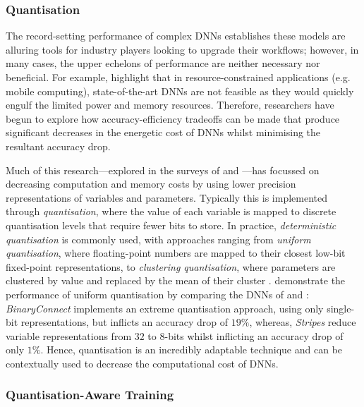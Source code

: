 \documentclass[a4paper, 11pt]{report}
\begin{document}
    \subsubsection{Quantisation}
    \label{section: quantisation}

    The record-setting performance of complex DNNs establishes these models are alluring tools for industry players looking to upgrade their workflows; however, in many cases, the upper echelons of performance are neither necessary nor beneficial. For example, \citet{kumar-2020} highlight that in resource-constrained applications (e.g. mobile computing), state-of-the-art DNNs are not feasible as they would quickly engulf the limited power and memory resources. Therefore, researchers have begun to explore how accuracy-efficiency tradeoffs can be made that produce significant decreases in the energetic cost of DNNs whilst minimising the resultant accuracy drop.
    
    Much of this research---explored in the surveys of \citet{xu-2021} and \citet{cai-2022}---has focussed on decreasing computation and memory costs by using lower precision representations of variables and parameters. Typically this is implemented through \emph{quantisation}, where the value of each variable is mapped to discrete quantisation levels that require fewer bits to store. In practice, \emph{deterministic quantisation} is commonly used, with approaches ranging from \emph{uniform quantisation}, where floating-point numbers are mapped to their closest low-bit fixed-point representations, to \emph{clustering quantisation}, where parameters are clustered by value and replaced by the mean of their cluster \citep{xu-2021}. \citet{kumar-2020} demonstrate the performance of uniform quantisation by comparing the DNNs of \citet{courbariaux-2015} and \citet{judd-2016}: \emph{BinaryConnect} \citep{courbariaux-2015} implements an extreme quantisation approach, using only single-bit representations, but inflicts an accuracy drop of $19\%$, whereas, \emph{Stripes} \citep{judd-2016} reduce variable representations from $32$ to $8$-bits whilst inflicting an accuracy drop of only $1\%$. Hence, quantisation is an incredibly adaptable technique and can be contextually used to decrease the computational cost of DNNs.

    \subsubsection{Quantisation-Aware Training}
    \label{section: quantisation-training}
\end{document}
